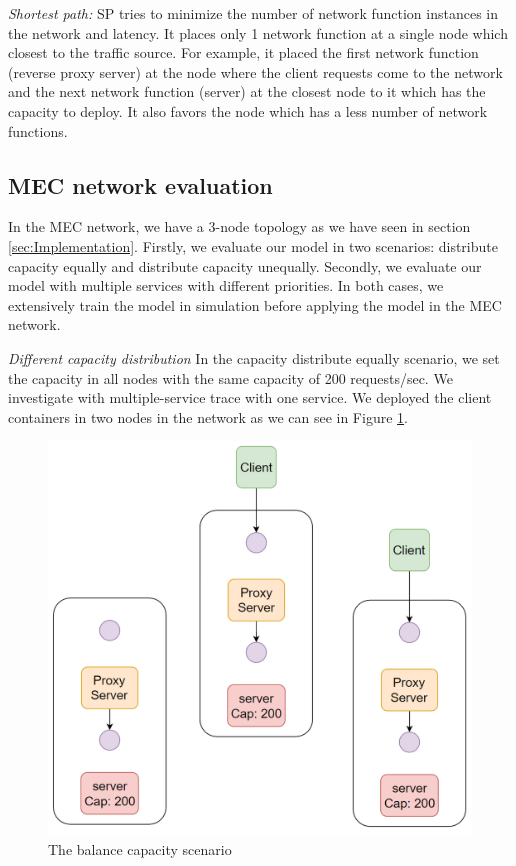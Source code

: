 \documentclass[conference]{IEEEtran}
\begin{document}
\textit{Shortest path:} SP tries to minimize the number of network function instances in the network and latency. It places only 1 network function at a single node which closest to the traffic source. For example, it placed the first network function (reverse proxy server) at the node where the client requests come to the network and the next network function (server) at the closest node to it which has the capacity to deploy. It also favors the node which has a less number of network functions. 

\subsection{MEC network evaluation}
In the MEC network, we have a 3-node topology as we have seen in section \ref{sec:Implementation}. Firstly, we evaluate our model in two scenarios: distribute capacity equally and distribute capacity unequally. Secondly, we evaluate our model with multiple services with different priorities. In both cases, we extensively train the model in simulation before applying the model in the MEC network. 

\textit{Different capacity distribution}
In the capacity distribute equally scenario, we set the capacity in all nodes with the same capacity of 200 requests/sec. We investigate with multiple-service trace with one service. We deployed the client containers in two nodes in the network as we can see in Figure \ref{fig:balance_capacity_scenario}.

\begin{figure}[]
    \centering
    \includegraphics[scale = 0.5]{imgs/balance_capacity_scenario.png}
    \caption{The balance capacity scenario}
    \label{fig:balance_capacity_scenario}
\end{figure}
\end{document}
